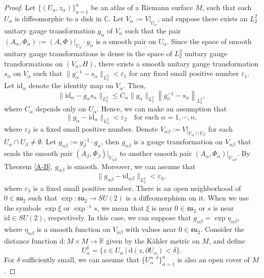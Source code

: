\documentclass[a4paper]{amsart}
\theoremstyle{definition}
\theoremstyle{remark}
\numberwithin{equation}{section}
\begin{document}
\begin{proof}
Let $\big\{(U_\alpha, z_\alpha)\big\}_{\alpha=1}^n$ be an atlas of a Riemann surface $M$, such that each $U_\alpha$ is diffeomorphic to a disk in $\mathbb{C}$.  Let $V_\alpha := V\big|_{U_\alpha}$, and suppose there exists an $L_2^2$ unitary gauge transformation $g_\alpha$ of $V_\alpha$ such that the pair $(A_\alpha, \Phi_\alpha) := (A, \Phi)\big|_{U_\alpha} \cdot g_\alpha$ is a smooth pair on $U_\alpha$. Since the space of smooth unitary gauge transformations is dense in the space of $L_2^2$ unitary gauge transformations on $(V_\alpha, H)$, there exists a smooth unitary gauge transformation $s_\alpha$ on $V_\alpha$ such that $\|g_\alpha^{-1} - s_\alpha\|_{L_2^2} < \varepsilon_1$ for any fixed small positive number $\varepsilon_1$. Let $\mathrm{id}_\alpha$ denote the identity map on $V_\alpha$. Then,
\[
\|\mathrm{id}_\alpha - g_\alpha s_\alpha\|_{L_2^2} \leq C_\alpha \|g_\alpha\|_{L_2^2} \left\|g_\alpha^{-1} - s_\alpha\right\|_{L_2^2},
\]
where $C_\alpha$ depends only on $U_\alpha$. Hence, we can make an assumption that
\[
\|g_\alpha - \mathrm{id}_\alpha\|_{L_2^2} < \varepsilon_2 \quad \text{for each } \alpha = 1, \cdots, n,
\]
where $\varepsilon_2$ is a fixed small positive number. Denote $V_{\alpha\beta} := V|_{U_\alpha \cap U_\beta}$ for each $U_\alpha \cap U_\beta \neq \emptyset$. Let $g_{\alpha\beta} := g_\beta^{-1} \cdot g_\alpha$, then $g_{\alpha\beta}$ is a gauge transformation on $V_{\alpha\beta}$ that sends the smooth pair $(A_\beta, \Phi_\beta)|_{U_{\alpha\beta}}$ to another smooth pair $(A_\alpha, \Phi_\alpha)|_{U_{\alpha\beta}}$. By Theorem \ref{A-B}, $g_{\alpha\beta}$ is smooth. Moreover, we can assume that
\[
\|g_{\alpha\beta} - \mathrm{id}_{\alpha\beta}\|_{L_2^2} < \varepsilon_3,
\]
where $\varepsilon_3$ is a fixed small positive number. There is an open neighborhood of $0 \in \mathfrak{su}_2$ such that $\exp : \mathfrak{su}_2 \to SU(2)$ is a diffeomorphism on it. When we use the symbols $\exp \xi$ or $\exp^{-1}s$, we mean that $\xi$ is near $0 \in \mathfrak{su}_2$ or $s$ is near $\mathrm{id} \in SU(2)$, respectively. In this case, we can suppose that $g_{\alpha\beta} = \exp \eta_{\alpha\beta}$, where $\eta_{\alpha\beta}$ is a smooth function on $V_{\alpha\beta}$ with values near $0\in\mathfrak{su}_2$. Consider the distance function $\text{d}: M \times M \to \mathbb{R}$ given by the Kähler metric on $M$, and define 
\[
U_\alpha^\delta = \big\{z \in U_\alpha \ | \ \text{d}(z, \partial U_\alpha) < \delta\big\}.
\]
For $\delta$ sufficiently small, we can assume that $\{U_\alpha^{n\cdot\delta}\}_{\alpha=1}^n$ is also an open cover of $M$. 


\end{proof}
\end{document}

